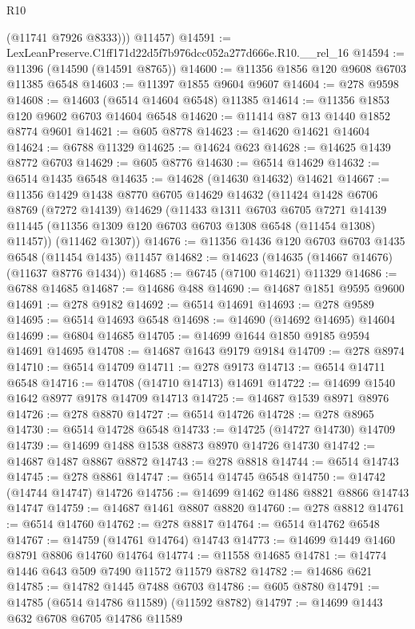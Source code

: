 \begin{lexlean}{R10}
\begin{coremodule}
          (@11741 @7926 @8333)))
      @11457)
@14591 := LexLeanPreserve.C1ff171d22d5f7b976dcc052a277d666e.R10.__rel_16
@14594 := @11396 (@14590 (@14591 @8765))
@14600 := @11356 @1856 @120 @9608 @6703 @11385 @6548
@14603 := @11397 @1855 @9604 @9607
@14604 := @278 @9598
@14608 := @14603 (@6514 @14604 @6548) @11385
@14614 := @11356 @1853 @120 @9602 @6703 @14604 @6548
@14620 := @11414 @87 @13 @1440 @1852 @8774 @9601
@14621 := @605 @8778
@14623 := @14620 @14621 @14604
@14624 := @6788 @11329
@14625 := @14624 @623
@14628 := @14625 @1439 @8772 @6703
@14629 := @605 @8776
@14630 := @6514 @14629
@14632 := @6514 @1435 @6548
@14635 := @14628 (@14630 @14632) @14621
@14667 := @11356
    @1429
    @1438
    @8770
    @6705
    @14629
    @14632
    (@11424
      @1428
      @6706
      @8769
      (@7272 @14139)
      @14629
      (@11433
        @1311
        @6703
        @6705
        @7271
        @14139
        @11445
        (@11356 @1309 @120 @6703 @6703 @1308 @6548 (@11454 @1308) @11457))
      (@11462 @1307))
@14676 := @11356 @1436 @120 @6703 @6703 @1435 @6548 (@11454 @1435) @11457
@14682 := @14623 (@14635 (@14667 @14676) (@11637 @8776 @1434))
@14685 := @6745 (@7100 @14621) @11329
@14686 := @6788 @14685
@14687 := @14686 @488
@14690 := @14687 @1851 @9595 @9600
@14691 := @278 @9182
@14692 := @6514 @14691
@14693 := @278 @9589
@14695 := @6514 @14693 @6548
@14698 := @14690 (@14692 @14695) @14604
@14699 := @6804 @14685
@14705 := @14699 @1644 @1850 @9185 @9594 @14691 @14695
@14708 := @14687 @1643 @9179 @9184
@14709 := @278 @8974
@14710 := @6514 @14709
@14711 := @278 @9173
@14713 := @6514 @14711 @6548
@14716 := @14708 (@14710 @14713) @14691
@14722 := @14699 @1540 @1642 @8977 @9178 @14709 @14713
@14725 := @14687 @1539 @8971 @8976
@14726 := @278 @8870
@14727 := @6514 @14726
@14728 := @278 @8965
@14730 := @6514 @14728 @6548
@14733 := @14725 (@14727 @14730) @14709
@14739 := @14699 @1488 @1538 @8873 @8970 @14726 @14730
@14742 := @14687 @1487 @8867 @8872
@14743 := @278 @8818
@14744 := @6514 @14743
@14745 := @278 @8861
@14747 := @6514 @14745 @6548
@14750 := @14742 (@14744 @14747) @14726
@14756 := @14699 @1462 @1486 @8821 @8866 @14743 @14747
@14759 := @14687 @1461 @8807 @8820
@14760 := @278 @8812
@14761 := @6514 @14760
@14762 := @278 @8817
@14764 := @6514 @14762 @6548
@14767 := @14759 (@14761 @14764) @14743
@14773 := @14699 @1449 @1460 @8791 @8806 @14760 @14764
@14774 := @11558 @14685
@14781 := @14774 @1446 @643 @509 @7490 @11572 @11579 @8782
@14782 := @14686 @621
@14785 := @14782 @1445 @7488 @6703
@14786 := @605 @8780
@14791 := @14785 (@6514 @14786 @11589) (@11592 @8782)
@14797 := @14699 @1443 @632 @6708 @6705 @14786 @11589

\end{coremodule}
\end{lexlean}
